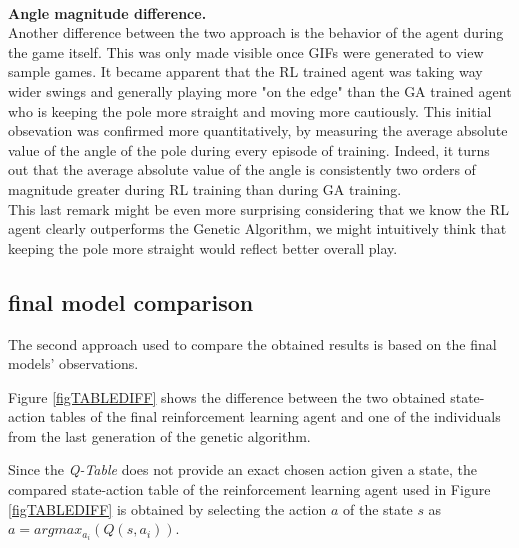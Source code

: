 \\
\textbf{Angle magnitude difference.}\\
Another difference between the two approach is the behavior of the agent during the game itself.
This was only made visible once GIFs were generated to view sample games. It became apparent that the RL trained agent was taking way wider swings and generally playing more "on the edge" than the GA trained agent who is keeping the pole more straight and moving more cautiously.
This initial obsevation was confirmed more quantitatively, by measuring the average absolute value of the angle of the pole during every episode of training.
Indeed, it turns out that the average absolute value of the angle is consistently two orders of magnitude greater during RL training than during GA training.
\\
This last remark might be even more surprising considering that we know the RL agent clearly outperforms the Genetic Algorithm, we might intuitively think that keeping the pole more straight would reflect better overall play.


\subsection{final model comparison}

The second approach used to compare the obtained results is based on the final models' observations.

Figure \ref{figTABLEDIFF} shows the difference between the two obtained state-action tables of the final reinforcement learning agent and one of the individuals from the last generation of the genetic algorithm.

Since the \textit{Q-Table} does not provide an exact chosen action given a state, the compared state-action table of the reinforcement learning agent used in Figure \ref{figTABLEDIFF} is obtained by selecting the action $a$ of the state $s$ as $a = argmax_{a_i} (Q(s,a_i))$.

